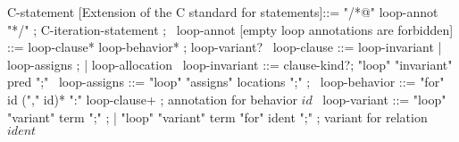 \begin{syntax}
  C-statement [Extension of the C  standard for statements]::= "/*@" loop-annot "*/" ;
  C-iteration-statement ;
  \
  loop-annot [empty loop annotations are forbidden] ::= loop-clause* loop-behavior* ;
                 loop-variant?
  \
  loop-clause ::= loop-invariant | loop-assigns ;
                | loop-allocation
  \
  loop-invariant ::= clause-kind?;
                     "loop" "invariant" pred ";" 
  \
  loop-assigns ::= "loop" "assigns" locations ";" ;
  \
  loop-behavior ::= "for" id ("," id)* ":" loop-clause+ ; annotation for behavior $id$
  \
  loop-variant ::= "loop" "variant" term ";" ;
  | "loop" "variant" term "for" ident ";" ; variant for relation $ident$
\end{syntax}
